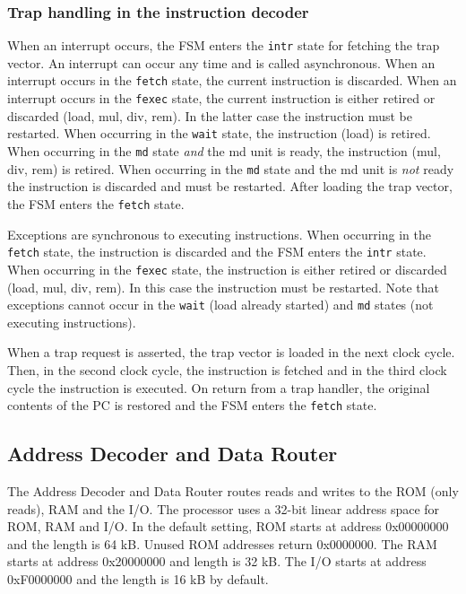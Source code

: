 \documentclass[12pt]{article}
\begin{document}
\subsubsection{Trap handling in the instruction decoder}
When an interrupt occurs, the FSM enters the \texttt{intr} state for fetching the trap vector. An interrupt can occur any time and is called asynchronous. When an interrupt occurs in the \texttt{fetch} state, the current instruction is discarded. When an interrupt occurs in the \texttt{fexec} state, the current instruction is either retired or discarded (load, mul, div, rem). In the latter case the instruction must be restarted. When occurring in the \texttt{wait} state, the instruction (load) is retired. When occurring in the \texttt{md} state \emph{and} the md unit is ready, the instruction (mul, div, rem) is retired. When occurring in the \texttt{md} state and the md unit is \emph{not} ready the instruction is discarded and must be restarted. After loading the trap vector, the FSM enters the \texttt{fetch} state.

Exceptions are synchronous to executing instructions. When occurring in the \texttt{fetch} state, the instruction is discarded and the FSM enters the \texttt{intr} state. When occurring in the \texttt{fexec} state, the instruction is either retired or discarded (load, mul, div, rem). In this case the instruction must be restarted. Note that exceptions cannot occur in the \texttt{wait} (load already started) and \texttt{md} states (not executing instructions).

When a trap request is asserted, the trap vector is loaded in the next clock cycle. Then, in the second clock cycle, the instruction is fetched and in the third clock cycle the instruction is executed. On return from a trap handler, the original contents of the PC is restored and the FSM enters the \texttt{fetch} state.


\subsection{Address Decoder and Data Router}
\label{sec:addressdecoderanddatarouter}
The Address Decoder and Data Router routes reads and writes to the ROM (only reads), RAM and the I/O. The processor uses a 32-bit linear address space for ROM, RAM and I/O. In the default setting, ROM starts at address 0x00000000 and the length is 64 kB. Unused ROM addresses return 0x0000000. The RAM starts at address 0x20000000 and length is 32 kB. The I/O starts at address 0xF0000000 and the length is 16 kB by default.
\end{document}
